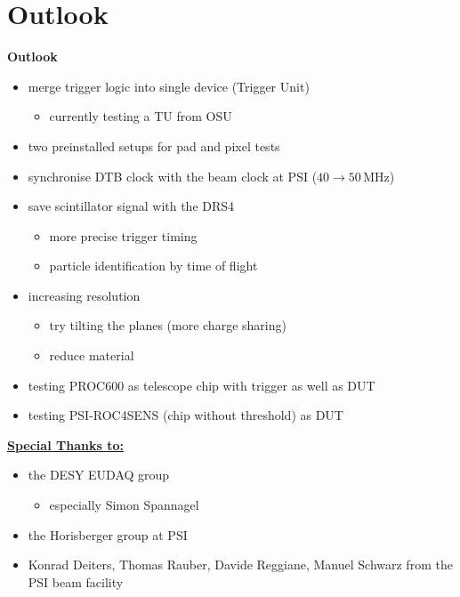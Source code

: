 \documentclass[9pt]{beamer}
\begin{document}
\section{Outlook}
\begin{frame}
	\begin{alertblock}{
		\centering
		\Large{\textbf{Outlook}}}		                        
	\end{alertblock}
	\begin{itemize}
		\setlength{\itemsep}{\fill}
		\item merge trigger logic into single device (Trigger Unit)
		\begin{itemize}
			\item currently testing a TU from OSU
		\end{itemize}
		\item two preinstalled setups for pad and pixel tests
		\item synchronise DTB clock with the beam clock at PSI ($40\rightarrow50$\,MHz)
		\item save scintillator signal with the DRS4
		\begin{itemize}
			\item more precise trigger timing
			\item particle identification by time of flight
		\end{itemize}
		\item increasing resolution
		\begin{itemize}
			\item try tilting the planes (more charge sharing)
			\item reduce material
		\end{itemize}
		\item testing PROC600 as telescope chip with trigger as well as DUT
		\item testing PSI-ROC4SENS (chip without threshold) as DUT
	\end{itemize}
\end{frame}
\begin{frame}
	\underline{\textbf{Special Thanks to:}}\as
	\begin{itemize}
		\setlength{\itemsep}{\fill}
		\item the DESY EUDAQ group
		\begin{itemize}
			\item especially Simon Spannagel
		\end{itemize}
		\item the Horisberger group at PSI
		\item Konrad Deiters, Thomas Rauber, Davide Reggiane, Manuel Schwarz from the PSI beam facility
	\end{itemize}
\end{frame}
\end{document}
